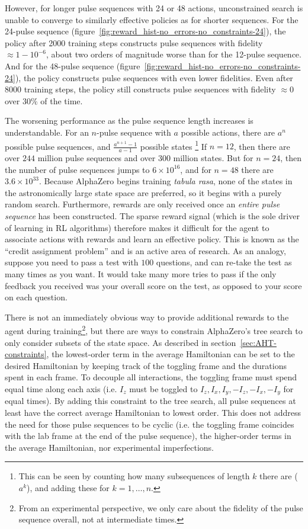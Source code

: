 However, for longer pulse sequences with 24 or 48 actions, unconstrained search is unable to converge to similarly effective policies as for shorter sequences. For the 24-pulse sequence (figure~\ref{fig:reward_hist-no_errors-no_constraints-24}), the policy after 2000 training steps constructs pulse sequences with fidelity $\approx 1 - 10^{-6}$, about two orders of magnitude worse than for the 12-pulse sequence.
And for the 48-pulse sequence (figure~\ref{fig:reward_hist-no_errors-no_constraints-24}), the policy constructs pulse sequences with even lower fidelities. Even after 8000 training steps, the policy still constructs pulse sequences with fidelity $\approx 0$ over $30\%$ of the time.

The worsening performance as the pulse sequence length increases is understandable. For an $n$-pulse sequence with $a$ possible actions, there are $a^n$ possible pulse sequences, and $\frac{a^{n+1} - 1}{a-1}$ possible states%
\footnote{
This can be seen by counting how many subsequences of length $k$ there are ($a^k$), and adding these for $k = 1, \dots, n$.
}
If $n=12$, then there are over $244$ million pulse sequences and over $300$ million states.
But for $n=24$, then the number of pulse sequences jumps to $6 \times 10^{16}$, and for $n=48$ there are $3.6 \times 10^{33}$. Because AlphaZero begins training \emph{tabula rasa}, none of the states in the astronomically large state space are preferred, so it begins with a purely random search.
Furthermore, rewards are only received once an \emph{entire pulse sequence} has been constructed. The sparse reward signal (which is the sole driver of learning in RL algorithms) therefore makes it difficult for the agent to associate actions with rewards and learn an effective policy.
This is known as the ``credit assignment problem'' and is an active area of research.
As an analogy, suppose you need to pass a test with $100$ questions, and can re-take the test as many times as you want. It would take many more tries to pass if the only feedback you received was your overall score on the test, as opposed to your score on each question.

There is not an immediately obvious way to provide additional rewards to the agent during training\footnote{
From an experimental perspective, we only care about the fidelity of the pulse sequence overall, not at intermediate times.
},
but there are ways to constrain AlphaZero's tree search to only consider subsets of the state space.
As described in section~\ref{sec:AHT-constraints}, the lowest-order term in the average Hamiltonian can be set to the desired Hamiltonian by keeping track of the toggling frame and the durations spent in each frame. To decouple all interactions, the toggling frame must spend equal time along each axis (i.e. $I_z$ must be toggled to $I_z, I_x, I_y, -I_z, -I_x, -I_y$ for equal times).
By adding this constraint to the tree search, all pulse sequences at least have the correct average Hamiltonian to lowest order. This does not address the need for those pulse sequences to be cyclic (i.e. the toggling frame coincides with the lab frame at the end of the pulse sequence), the higher-order terms in the average Hamiltonian, nor experimental imperfections.

